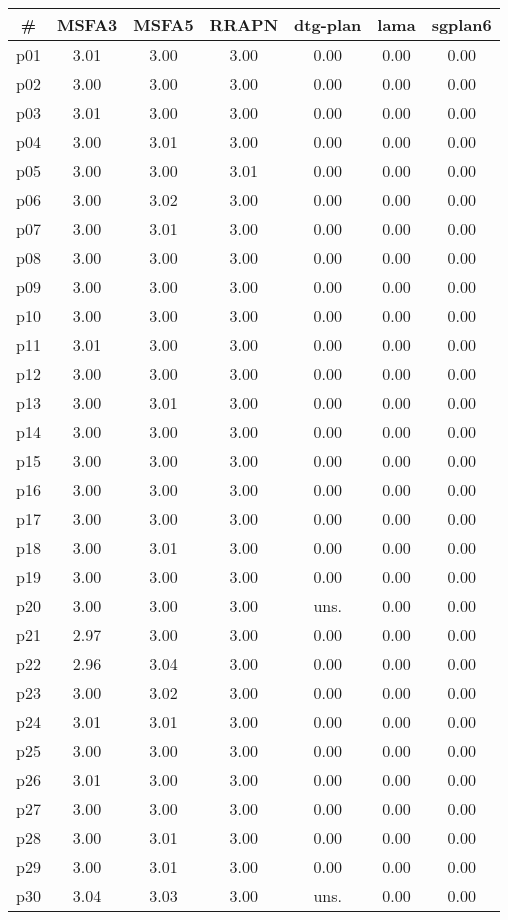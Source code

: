 \begin{tabular}{c||c|c|c|c|c|c}
\textbf{\#} & \textbf{MSFA3} & \textbf{MSFA5} & \textbf{RRAPN} & \textbf{dtg-plan} & \textbf{lama} & \textbf{sgplan6}\\
\hline
\hline
p01 & 3.01 & 3.00 & 3.00 & 0.00 & 0.00 & 0.00\\
p02 & 3.00 & 3.00 & 3.00 & 0.00 & 0.00 & 0.00\\
p03 & 3.01 & 3.00 & 3.00 & 0.00 & 0.00 & 0.00\\
p04 & 3.00 & 3.01 & 3.00 & 0.00 & 0.00 & 0.00\\
p05 & 3.00 & 3.00 & 3.01 & 0.00 & 0.00 & 0.00\\
p06 & 3.00 & 3.02 & 3.00 & 0.00 & 0.00 & 0.00\\
p07 & 3.00 & 3.01 & 3.00 & 0.00 & 0.00 & 0.00\\
p08 & 3.00 & 3.00 & 3.00 & 0.00 & 0.00 & 0.00\\
p09 & 3.00 & 3.00 & 3.00 & 0.00 & 0.00 & 0.00\\
p10 & 3.00 & 3.00 & 3.00 & 0.00 & 0.00 & 0.00\\
p11 & 3.01 & 3.00 & 3.00 & 0.00 & 0.00 & 0.00\\
p12 & 3.00 & 3.00 & 3.00 & 0.00 & 0.00 & 0.00\\
p13 & 3.00 & 3.01 & 3.00 & 0.00 & 0.00 & 0.00\\
p14 & 3.00 & 3.00 & 3.00 & 0.00 & 0.00 & 0.00\\
p15 & 3.00 & 3.00 & 3.00 & 0.00 & 0.00 & 0.00\\
p16 & 3.00 & 3.00 & 3.00 & 0.00 & 0.00 & 0.00\\
p17 & 3.00 & 3.00 & 3.00 & 0.00 & 0.00 & 0.00\\
p18 & 3.00 & 3.01 & 3.00 & 0.00 & 0.00 & 0.00\\
p19 & 3.00 & 3.00 & 3.00 & 0.00 & 0.00 & 0.00\\
p20 & 3.00 & 3.00 & 3.00 & uns. & 0.00 & 0.00\\
p21 & 2.97 & 3.00 & 3.00 & 0.00 & 0.00 & 0.00\\
p22 & 2.96 & 3.04 & 3.00 & 0.00 & 0.00 & 0.00\\
p23 & 3.00 & 3.02 & 3.00 & 0.00 & 0.00 & 0.00\\
p24 & 3.01 & 3.01 & 3.00 & 0.00 & 0.00 & 0.00\\
p25 & 3.00 & 3.00 & 3.00 & 0.00 & 0.00 & 0.00\\
p26 & 3.01 & 3.00 & 3.00 & 0.00 & 0.00 & 0.00\\
p27 & 3.00 & 3.00 & 3.00 & 0.00 & 0.00 & 0.00\\
p28 & 3.00 & 3.01 & 3.00 & 0.00 & 0.00 & 0.00\\
p29 & 3.00 & 3.01 & 3.00 & 0.00 & 0.00 & 0.00\\
p30 & 3.04 & 3.03 & 3.00 & uns. & 0.00 & 0.00\\
\end{tabular}

